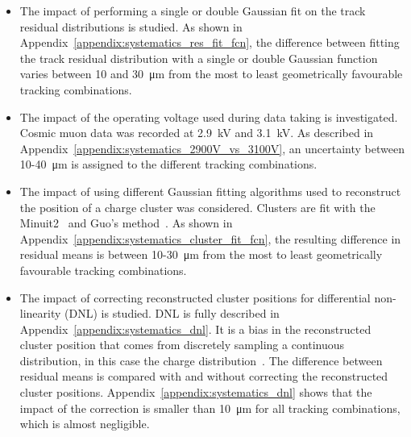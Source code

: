 \begin{itemize}
  \item The impact of performing a single or double Gaussian fit on the track residual distributions is studied. As shown in Appendix~\ref{appendix:systematics_res_fit_fcn}, the difference between fitting the track residual distribution with a single or double Gaussian function varies between 10 and \SI{30}{\micro\meter} from the most to least geometrically favourable tracking combinations.
  \item The impact of the operating voltage used during data taking is investigated. Cosmic muon data was recorded at \SI{2.9}{kV} and \SI{3.1}{kV}. As described in Appendix~\ref{appendix:systematics_2900V_vs_3100V}, an uncertainty between 10-\SI{40}{\micro\meter} is assigned to the different tracking combinations.
  \item The impact of using different Gaussian fitting algorithms used to reconstruct the position of a charge cluster was considered. Clusters are fit with the Minuit2~\cite{hatlo_developments_2005} and Guo's method~\cite{guo_simple_2011}. As shown in Appendix~\ref{appendix:systematics_cluster_fit_fcn}, the resulting difference in residual means is between 10-\SI{30}{\micro\meter} from the most to least geometrically favourable tracking combinations.
  \item The impact of correcting reconstructed cluster positions for differential non-linearity (DNL) is studied. DNL is fully described in Appendix~\ref{appendix:systematics_dnl}. It is a bias in the reconstructed cluster position that comes from discretely sampling a continuous distribution, in this case the charge distribution~\cite{endo_systematic_1981, lefebvre_thesis, abusleme_performance_2016}. The difference between residual means is compared with and without correcting the reconstructed cluster positions. Appendix~\ref{appendix:systematics_dnl} shows that the impact of the correction is smaller than \SI{10}{\micro\meter} for all tracking combinations, which is almost negligible.
\end{itemize}


